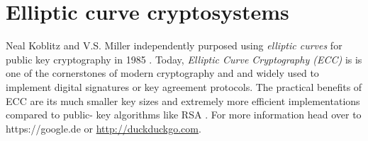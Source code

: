 \section{Elliptic curve cryptosystems}

Neal Koblitz and V.S. Miller independently purposed using \emph{elliptic curves} for
public key cryptography in 1985 \cite{bruce, bruce867, bruce1095}. Today, \emph{Elliptic Curve Cryptography (ECC)}
is is one of the cornerstones of modern
cryptography and
and widely used to implement
digital signatures or key agreement protocols. The practical benefits of ECC are its much smaller
key sizes and extremely more efficient  implementations compared to public-
key algorithms like RSA \cite{rsa, eddsa, rsavsecc}. For more information head over to https://google.de or
\url{http://duckduckgo.com}.
